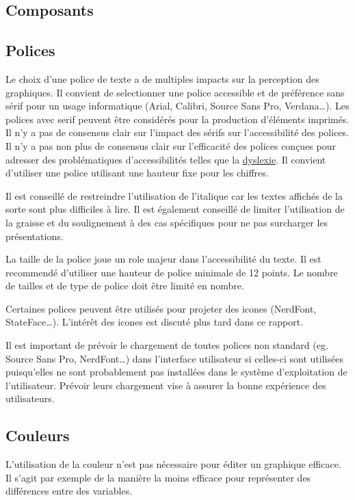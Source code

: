 \documentclass[a4paper,12pt]{article}
\begin{document}
\begin{multicols}{2}
\section{Composants}
\label{sec:org028bb8a}
\subsection{Polices}
\label{sec:orgb6243e0}
Le choix d'une police de texte a de multiples impacts sur la perception des graphiques. Il convient de selectionner une police accessible et de préférence sans sérif pour un usage informatique (Arial, Calibri, Source Sans Pro, Verdana\ldots{}). \autocite{andreaskrauseBestPracticesData2024} Les polices avec serif peuvent être considérés pour la production d'éléments imprimés. Il n'y a pas de consensus clair sur l'impact des sérifs sur l'accessibilité des polices. \autocite{stephenfewTableDesign2012} Il n'y a pas non plus de consensus clair sur l'efficacité des polices conçues pour adresser des problématiques d'accessibilités telles que la \protect\hyperlink{gls-11}{\label{gls-11-use-1}dyslexie}. Il convient d'utiliser une police utilisant une hauteur fixe pour les chiffres. \autocite{stephenfewTableDesign2012}

Il est conseillé de restreindre l'utilisation de l'italique car les textes affichés de la sorte sont plus difficiles à lire. Il est également conseillé de limiter l'utilisation de la graisse et du soulignement à des cas spécifiques pour ne pas surcharger les présentations.

La taille de la police joue un role majeur dans l'accessibilité du texte. Il est recommendé d'utiliser une hauteur de police minimale de 12 points.\autocite{andreaskrauseBestPracticesData2024} Le nombre de tailles et de type de police doit être limité en nombre.\autocite{andreaskrauseBestPracticesData2024}

Certaines polices peuvent être utilisés pour projeter des icones (NerdFont, StateFace\ldots{}).\autocite{jonathanschwabishQualitative2021} L'intérêt des icones est discuté plus tard dans ce rapport.

Il est important de prévoir le chargement de toutes polices non standard (eg. Source Sans Pro, NerdFont\ldots{}) dans l'interface utilisateur si celles-ci sont utilisées puisqu'elles ne sont probablement pas installées dans le système d'exploitation de l'utilisateur. Prévoir leurs chargement vise à assurer la bonne expérience des utilisateurs.
\subsection{Couleurs}
\label{sec:org7ac94a9}
L'utilisation de la couleur n'est pas nécessaire pour éditer un graphique efficace. Il s'agit par exemple de la manière la moins efficace pour représenter des différences entre des variables. \autocite{beechamUseGlyphmapsAnalysing2021}


\end{multicols}
\end{document}
